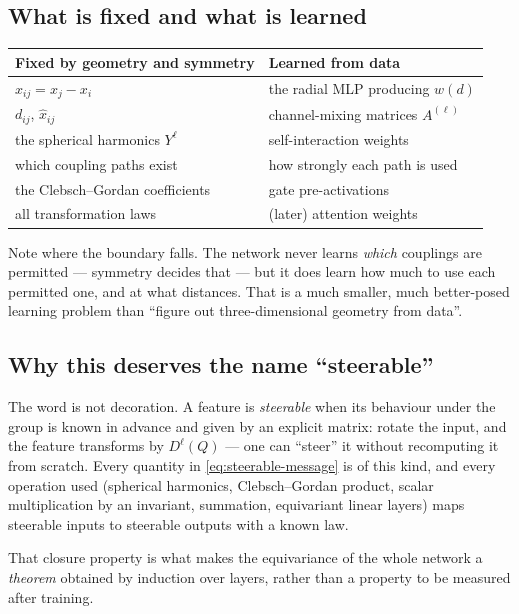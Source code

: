 \documentclass[11pt,a4paper]{report}
\theoremstyle{definition}
\theoremstyle{remark}
\begin{document}
\subsection{What is fixed and what is learned}
\label{sec:mp-fixed-learned}

\begin{center}
\begin{tabular}{ll}
\toprule
Fixed by geometry and symmetry & Learned from data \\
\midrule
$x_{ij}=x_j-x_i$ & the radial MLP producing $w(d)$ \\
$d_{ij}$, $\hat x_{ij}$ & channel-mixing matrices $A^{(\ell)}$ \\
the spherical harmonics $Y^\ell$ & self-interaction weights \\
which coupling paths exist & how strongly each path is used \\
the Clebsch--Gordan coefficients & gate pre-activations \\
all transformation laws & (later) attention weights \\
\bottomrule
\end{tabular}
\end{center}

Note where the boundary falls. The network never learns \emph{which}
couplings are permitted --- symmetry decides that --- but it does learn how
much to use each permitted one, and at what distances. That is a much
smaller, much better-posed learning problem than ``figure out
three-dimensional geometry from data''.

\subsection{Why this deserves the name ``steerable''}
\label{sec:why-steerable}

The word is not decoration. A feature is \emph{steerable} when its behaviour
under the group is known in advance and given by an explicit matrix: rotate
the input, and the feature transforms by $D^\ell(Q)$ --- one can ``steer'' it
without recomputing it from scratch. Every quantity in
\eqref{eq:steerable-message} is of this kind, and every operation used
(spherical harmonics, Clebsch--Gordan product, scalar multiplication by an
invariant, summation, equivariant linear layers) maps steerable inputs to
steerable outputs with a known law.

That closure property is what makes the equivariance of the whole network a
\emph{theorem} obtained by induction over layers, rather than a property to
be measured after training.
\end{document}
